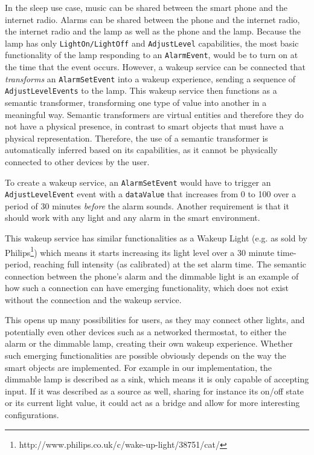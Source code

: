 In the sleep use case, music can be shared between the smart phone and the internet radio. Alarms can be shared between the phone and the internet radio, the internet radio and the lamp as well as the phone and the lamp. Because the lamp has only \texttt{LightOn/LightOff} and \texttt{AdjustLevel} capabilities, the most basic functionality of the lamp responding to an \texttt{AlarmEvent}, would be to turn on at the time that the event occurs. However, a wakeup service can be connected that \emph{transforms} an \texttt{AlarmSetEvent} into a wakeup experience, sending a sequence of \texttt{AdjustLevelEvents} to the lamp. This wakeup service then functions as a semantic transformer, transforming one type of value into another in a meaningful way. Semantic transformers are virtual entities and therefore they do not have a physical presence, in contrast to smart objects that must have a physical representation. Therefore, the use of a semantic transformer is automatically inferred based on its capabilities, as it cannot be physically connected to other devices by the user. 

To create a wakeup service, an \texttt{AlarmSetEvent} would have to trigger an \texttt{AdjustLevelEvent} event with a \texttt{dataValue} that increases from 0 to 100 over a period of 30 minutes \emph{before} the alarm sounds. Another requirement is that it should work with any light and any alarm in the smart environment. 


This wakeup service has similar functionalities as a Wakeup Light (e.g. as sold by Philips\footnote{http://www.philips.co.uk/c/wake-up-light/38751/cat/}) which means it starts increasing its light level over a 30 minute time-period, reaching full intensity (as calibrated) at the set alarm time. The semantic connection between the phone's alarm and the dimmable light is an example of how such a connection can have emerging functionality, which does not exist without the connection and the wakeup service.  

This opens up many possibilities for users, as they may connect other lights, and potentially even other devices such as a networked thermostat, to either the alarm or the dimmable lamp, creating their own wakeup experience. Whether such emerging functionalities are possible obviously depends on the way the smart objects are implemented. For example in our implementation, the dimmable lamp is described as a sink, which means it is only capable of accepting input. If it was described as a source as well, sharing for instance its on/off state or its current light value, it could act as a bridge and allow for more interesting configurations. %

